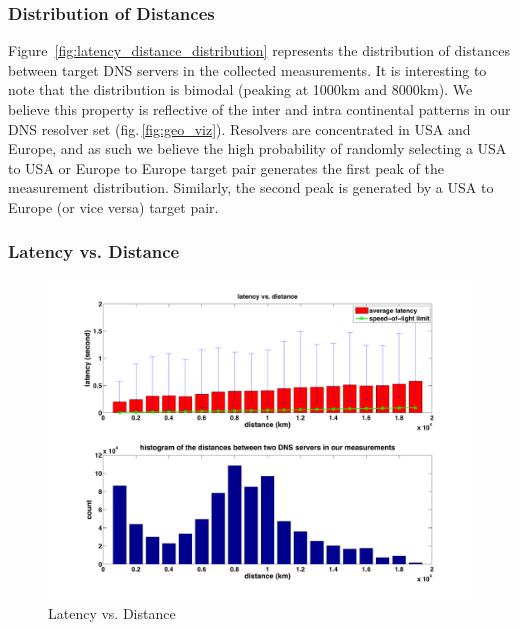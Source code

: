 \subsubsection{Distribution of Distances}
Figure \,\ref{fig:latency_distance_distribution} represents the distribution of distances between target DNS servers in the collected measurements. It is interesting to note that the distribution is bimodal (peaking at 1000km and 8000km). We believe this property is reflective of the inter and intra continental patterns in our DNS resolver set (fig.\,\ref{fig:geo_viz}). Resolvers are concentrated in USA and Europe, and as such we believe the high probability of randomly selecting a USA to USA or Europe to Europe target pair generates the first peak of the measurement distribution. Similarly, the second peak is generated by a USA to Europe (or vice versa) target pair.

\subsubsection{Latency vs. Distance}

\begin{figure}
  \centering
  \includegraphics[width=\linewidth]{../figs/King_latency_dist.pdf}
  \caption{Latency vs. Distance}
  \label{fig:latency_dist}
\end{figure}

